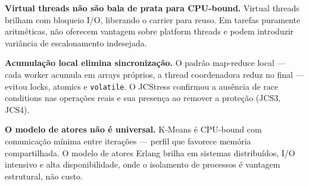 \textbf{Virtual threads não são bala de prata para CPU-bound.}
Virtual threads brilham com bloqueio I/O, liberando o carrier para reuso.
Em tarefas puramente aritméticas, não oferecem vantagem sobre platform threads
e podem introduzir variância de escalonamento indesejada.

\textbf{Acumulação local elimina sincronização.}
O padrão map-reduce local — cada worker acumula em arrays próprios, a thread
coordenadora reduz no final — evitou locks, atomics e \texttt{volatile}.
O JCStress confirmou a ausência de race conditions nas operações reais e sua
presença ao remover a proteção (JCS3, JCS4).

\textbf{O modelo de atores não é universal.}
K-Means é CPU-bound com comunicação mínima entre iterações — perfil que favorece
memória compartilhada. O modelo de atores Erlang brilha em sistemas distribuídos,
I/O intensivo e alta disponibilidade, onde o isolamento de processos é vantagem
estrutural, não custo.
